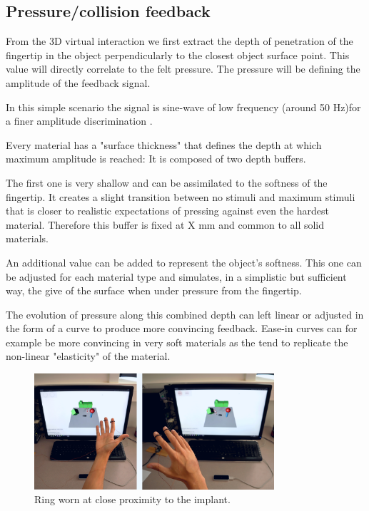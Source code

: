 \documentclass[10pt,journal,compsoc]{IEEEtran}
\begin{document}
\subsection{Pressure/collision feedback}
From the 3D virtual interaction we first extract the depth of penetration of the fingertip in the object perpendicularly to the closest object surface point. This value will directly correlate to the felt pressure. The pressure will be defining the amplitude of the feedback signal.
 
In this simple scenario the signal is sine-wave of low frequency (around 50 Hz)for a finer amplitude discrimination \cite{harrison2018tf}. 

Every material has a "surface thickness" that defines the depth at which maximum amplitude is reached: It is composed of two depth buffers. 

The first one is very shallow and can be assimilated to the softness of the fingertip. It creates a slight transition between no stimuli and maximum stimuli that is closer to realistic expectations of pressing against even the hardest material. Therefore this buffer is fixed at X mm and common to all solid materials.

An additional value can be added to represent the object's softness. This one can be adjusted for each material type and simulates, in a simplistic but sufficient way, the give of the surface when under pressure from the fingertip.

The evolution of pressure along this combined depth can left linear or adjusted in the form of a curve to produce more convincing feedback. Ease-in curves can for example be more convincing in very soft materials as the tend to replicate the non-linear "elasticity" of the material.

\begin{figure}[!t]
		\centering
		\includegraphics[width=3.5in]{Setup}
		\caption{Ring worn at close proximity to the implant.}
		\label{Setup}
\end{figure}
\end{document}

